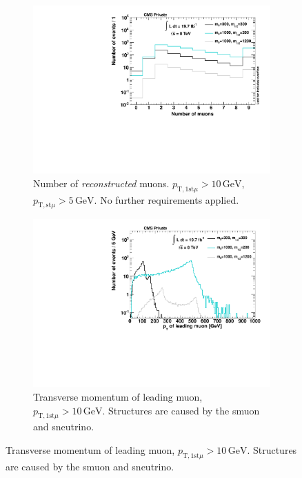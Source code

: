 \begin{figure}[!htbp]
  \centering
  \begin{subfigure}[b]{0.495\textwidth}
    \centering
    \includegraphics[width=\textwidth]{plots/sig_muo_n.pdf}
    \caption{Number of \textit{reconstructed} muons. $p_{\text{T}, 1\text{st} \mu} > 10\,\text{GeV}$, $p_{\text{T}, \text{st} \mu} > 5\,\text{GeV}$. No further requirements applied.\label{fig:sig_muo_n}}
  \end{subfigure}
  \begin{subfigure}[b]{0.495\textwidth}
    \centering
    \includegraphics[width=\textwidth]{plots/sig_muo_pt1.pdf}
    \caption{Transverse momentum of leading muon, $p_{\text{T}, 1\text{st} \mu} > 10\,\text{GeV}$. Structures are caused by the smuon and sneutrino\footnotemark.\label{fig:sig_muo_pt1}}
  \end{subfigure}
\end{figure}

